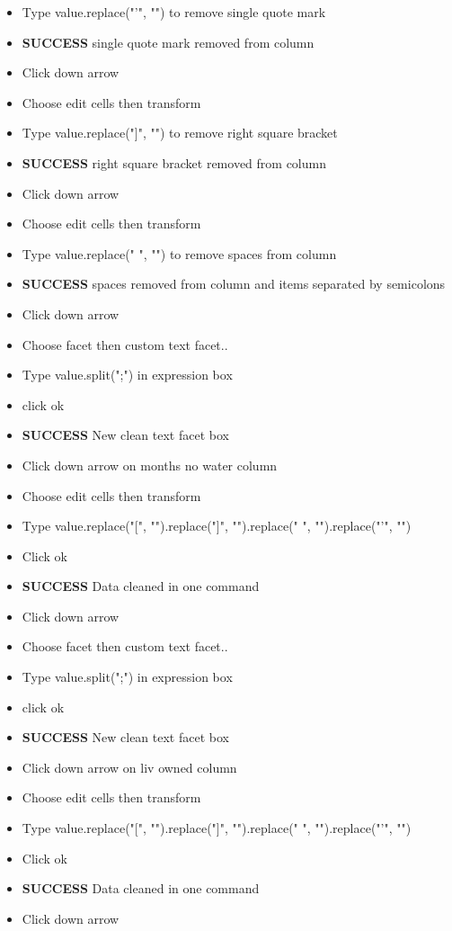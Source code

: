 \documentclass{article}
\begin{document}
\begin{itemize}
\item Type value.replace("'", "") to remove single quote mark
\item \textbf{SUCCESS} single quote mark removed from column
\item Click down arrow 
\item Choose edit cells then transform
\item Type value.replace("]", "") to remove right square bracket
\item \textbf{SUCCESS} right square bracket removed from column
\item Click down arrow 
\item Choose edit cells then transform
\item Type value.replace(" ", "") to remove spaces from column
\item \textbf{SUCCESS} spaces removed from column and items separated by semicolons
\item Click down arrow
\item Choose facet then custom text facet..
\item Type value.split(";") in expression box
\item click ok
\item \textbf{SUCCESS} New clean text facet box
\item Click down arrow on months no water column
\item Choose edit cells then transform
\item Type value.replace("[", "").replace("]", "").replace(" ", "").replace("'", "")
\item Click ok
\item \textbf{SUCCESS} Data cleaned in one command
\item Click down arrow
\item Choose facet then custom text facet..
\item Type value.split(";") in expression box
\item click ok
\item \textbf{SUCCESS} New clean text facet box
\item Click down arrow on liv owned column
\item Choose edit cells then transform
\item Type value.replace("[", "").replace("]", "").replace(" ", "").replace("'", "")
\item Click ok
\item \textbf{SUCCESS} Data cleaned in one command
\item Click down arrow

\end{itemize}
\end{document}
